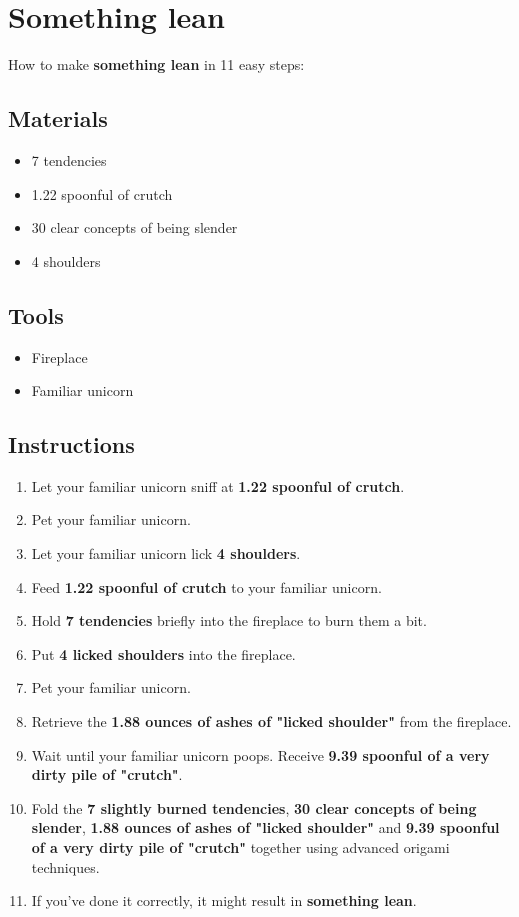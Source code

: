 \documentclass{article}
\begin{document}
\section{Something lean}How to make \textbf{something lean} in 11 easy steps:

\subsection{Materials}\begin{itemize}
\item 
7 tendencies
\item 
1.22 spoonful of crutch
\item 
30 clear concepts of being slender
\item 
4 shoulders
\end{itemize}
\subsection{Tools}\begin{itemize}
\item 
Fireplace
\item 
Familiar unicorn
\end{itemize}
\subsection{Instructions}\begin{enumerate}
\item 
Let your familiar unicorn sniff at \textbf{1.22 spoonful of crutch}.
\item 
Pet your familiar unicorn.
\item 
Let your familiar unicorn lick \textbf{4 shoulders}.
\item 
Feed \textbf{1.22 spoonful of crutch} to your familiar unicorn.
\item 
Hold \textbf{7 tendencies} briefly into the fireplace to burn them a bit.
\item 
Put \textbf{4 licked shoulders} into the fireplace.
\item 
Pet your familiar unicorn.
\item 
Retrieve the \textbf{1.88 ounces of ashes of "licked shoulder"} from the fireplace.
\item 
Wait until your familiar unicorn poops. Receive \textbf{9.39 spoonful of a very dirty pile of "crutch"}.
\item 
Fold the \textbf{7 slightly burned tendencies}, \textbf{30 clear concepts of being slender}, \textbf{1.88 ounces of ashes of "licked shoulder"} and \textbf{9.39 spoonful of a very dirty pile of "crutch"} together using advanced origami techniques.
\item 
If you've done it correctly, it might result in \textbf{something lean}.
\end{enumerate}
\newpage
\end{document}
